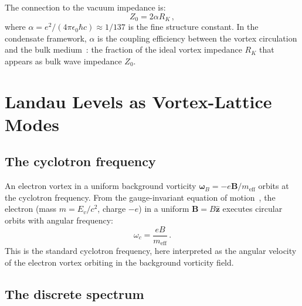 \documentclass[12pt, a4paper]{article}
\newcommand{\meff}{m_{\mathrm{eff}}}
\begin{document}
The connection to the vacuum impedance is:
\begin{equation}
    Z_0 = 2\alpha R_K\,,
\label{eq:Z0_RK}
\end{equation}
where $\alpha = e^2/(4\pi\epsilon_0\hbar c)
\approx 1/137$ is the fine structure constant. In
the condensate framework, $\alpha$ is the coupling
efficiency between the vortex circulation and the
bulk medium~\cite{kulangiev_impedance}: the fraction
of the ideal vortex impedance $R_K$ that appears as
bulk wave impedance $Z_0$.


\section{Landau Levels as Vortex-Lattice Modes}
\label{sec:landau}

\subsection{The cyclotron frequency}

An electron vortex in a uniform background vorticity
$\boldsymbol{\omega}_B = -e\mathbf{B}/\meff$
orbits at the cyclotron frequency. From the
gauge-invariant equation of
motion~\cite{kulangiev_inertia}, the electron
(mass $m = E_v/c^2$, charge $-e$) in a uniform
$\mathbf{B} = B\hat{\mathbf{z}}$ executes circular
orbits with angular frequency:
\begin{equation}
    \omega_c = \frac{eB}{\meff}\,.
\label{eq:omega_c}
\end{equation}
This is the standard cyclotron frequency, here
interpreted as the angular velocity of the electron
vortex orbiting in the background vorticity field.

\subsection{The discrete spectrum}
\end{document}
